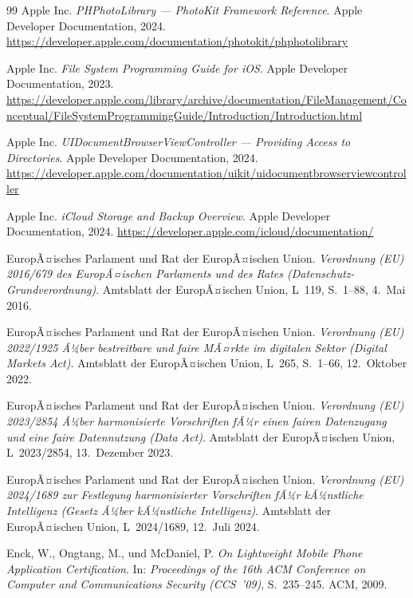 ﻿\documentclass[12pt, a4paper]{article}
\begin{document}
\begin{thebibliography}{99}
Apple Inc.
\newblock \emph{PHPhotoLibrary --- PhotoKit Framework Reference}.
\newblock Apple Developer Documentation, 2024.
\newblock \url{https://developer.apple.com/documentation/photokit/phphotolibrary}

Apple Inc.
\newblock \emph{File System Programming Guide for iOS}.
\newblock Apple Developer Documentation, 2023.
\newblock \url{https://developer.apple.com/library/archive/documentation/FileManagement/Conceptual/FileSystemProgrammingGuide/Introduction/Introduction.html}

Apple Inc.
\newblock \emph{UIDocumentBrowserViewController --- Providing Access to Directories}.
\newblock Apple Developer Documentation, 2024.
\newblock \url{https://developer.apple.com/documentation/uikit/uidocumentbrowserviewcontroller}

Apple Inc.
\newblock \emph{iCloud Storage and Backup Overview}.
\newblock Apple Developer Documentation, 2024.
\newblock \url{https://developer.apple.com/icloud/documentation/}

EuropÃ¤isches Parlament und Rat der EuropÃ¤ischen Union.
\newblock \emph{Verordnung (EU) 2016/679 des EuropÃ¤ischen Parlaments und des Rates
  (Datenschutz-Grundverordnung)}.
\newblock Amtsblatt der EuropÃ¤ischen Union, L~119, S.~1--88, 4.~Mai 2016.

EuropÃ¤isches Parlament und Rat der EuropÃ¤ischen Union.
\newblock \emph{Verordnung (EU) 2022/1925 Ã¼ber bestreitbare und faire MÃ¤rkte im
  digitalen Sektor (Digital Markets Act)}.
\newblock Amtsblatt der EuropÃ¤ischen Union, L~265, S.~1--66, 12.~Oktober 2022.

EuropÃ¤isches Parlament und Rat der EuropÃ¤ischen Union.
\newblock \emph{Verordnung (EU) 2023/2854 Ã¼ber harmonisierte Vorschriften fÃ¼r einen
  fairen Datenzugang und eine faire Datennutzung (Data Act)}.
\newblock Amtsblatt der EuropÃ¤ischen Union, L~2023/2854, 13.~Dezember 2023.

EuropÃ¤isches Parlament und Rat der EuropÃ¤ischen Union.
\newblock \emph{Verordnung (EU) 2024/1689 zur Festlegung harmonisierter Vorschriften
  fÃ¼r kÃ¼nstliche Intelligenz (Gesetz Ã¼ber kÃ¼nstliche Intelligenz)}.
\newblock Amtsblatt der EuropÃ¤ischen Union, L~2024/1689, 12.~Juli 2024.

Enck, W., Ongtang, M., und McDaniel, P.
\newblock \emph{On Lightweight Mobile Phone Application Certification}.
\newblock In: \emph{Proceedings of the 16th ACM Conference on Computer and
  Communications Security (CCS~'09)}, S.~235--245. ACM, 2009.


\end{thebibliography}
\end{document}
